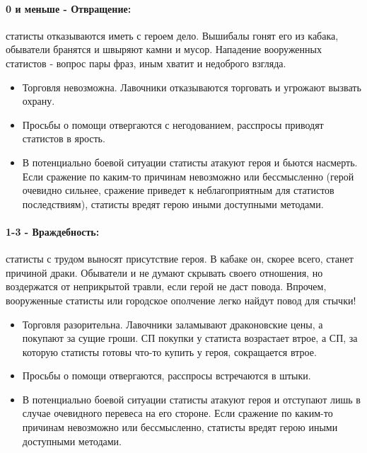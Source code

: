 \paragraph{0 и меньше - Отвращение:} статисты отказываются иметь с героем дело. Вышибалы гонят его из кабака, обыватели бранятся и швыряют камни и мусор. Нападение вооруженных статистов - вопрос пары фраз, иным хватит и недоброго взгляда.
\begin{itemize}
  \item Торговля невозможна. Лавочники отказываются торговать и угрожают вызвать охрану.
  \item Просьбы о помощи отвергаются с негодованием, расспросы приводят статистов в ярость.
  \item В потенциально боевой ситуации статисты атакуют героя и бьются насмерть. Если сражение по каким-то причинам невозможно или бессмысленно (герой очевидно сильнее, сражение приведет к неблагоприятным для статистов последствиям), статисты вредят герою иными доступными методами. 
\end{itemize}
\paragraph{1-3 - Враждебность:} статисты с трудом выносят присутствие героя. В кабаке он, скорее всего, станет причиной драки. Обыватели и не думают скрывать своего отношения, но воздержатся от неприкрытой травли, если герой не даст повода. Впрочем, вооруженные статисты или городское ополчение легко найдут повод для стычки!
\begin{itemize}
  \item Торговля разорительна. Лавочники заламывают драконовские цены, а покупают за сущие гроши. СП покупки у статиста возрастает втрое, а СП, за которую статисты готовы что-то купить у героя, сокращается втрое.
  \item Просьбы о помощи отвергаются, расспросы встречаются в штыки.
  \item В потенциально боевой ситуации статисты атакуют героя и отступают лишь в случае очевидного перевеса на его стороне. Если сражение по каким-то причинам невозможно или бессмысленно, статисты вредят герою иными доступными методами.
\end{itemize}
